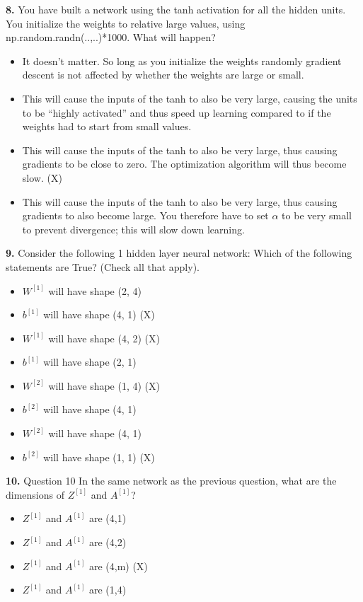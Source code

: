 \textbf{8.} You have built a network using the tanh activation for all the hidden units. You initialize the weights to relative large values, using np.random.randn(..,..)*1000. What will happen?
\begin{itemize}
    \item It doesn’t matter. So long as you initialize the weights randomly gradient descent is not affected by whether the weights are large or small.
    \item This will cause the inputs of the tanh to also be very large, causing the units to be “highly activated” and thus speed up learning compared to if the weights had to start from small values.
    \item This will cause the inputs of the tanh to also be very large, thus causing gradients to be close to zero. The optimization algorithm will thus become slow. (X)
    \item This will cause the inputs of the tanh to also be very large, thus causing gradients to also become large. You therefore have to set $\alpha$ to be very small to prevent divergence; this will slow down learning.
\end{itemize}
\textbf{9.} Consider the following 1 hidden layer neural network:
Which of the following statements are True? (Check all that apply).
\begin{itemize}
    \item $W^{[1]}$ will have shape (2, 4)
    \item $b^{[1]}$ will have shape (4, 1) (X)
    \item $W^{[1]}$ will have shape (4, 2) (X)
    \item $b^{[1]}$ will have shape (2, 1)
    \item $W^{[2]}$ will have shape (1, 4) (X)
    \item $b^{[2]}$ will have shape (4, 1)
    \item $W^{[2]}$ will have shape (4, 1)
    \item $b^{[2]}$ will have shape (1, 1) (X)
\end{itemize}
\textbf{10.} Question 10
In the same network as the previous question, what are the dimensions of $Z^{[1]}$ and $A^{[1]}$?
\begin{itemize}
    \item $Z^{[1]}$ and $A^{[1]}$ are (4,1)
    \item $Z^{[1]}$ and $A^{[1]}$ are (4,2)
    \item $Z^{[1]}$ and $A^{[1]}$ are (4,m) (X)
    \item $Z^{[1]}$ and $A^{[1]}$ are (1,4)
\end{itemize}